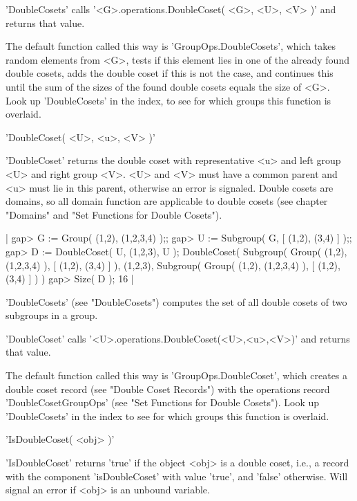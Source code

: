 'DoubleCosets' calls   '<G>.operations.DoubleCoset( <G>, <U>,  <V> )' and
returns that value.

The default  function called this  way is  'GroupOps.DoubleCosets', which
takes random elements from <G>, tests if this element lies  in one of the
already found double cosets, adds  the double  coset if this is  not  the
case, and continues this until the sum of the  sizes of  the found double
cosets equals the size of  <G>.  Look up 'DoubleCosets'  in the index, to
see for which groups this function is overlaid.

%

'DoubleCoset( <U>, <u>, <V> )'

'DoubleCoset'  returns the double coset with  representative <u> and left
group <U> and right group <V>.  <U> and <V> must have a common parent and
<u> must lie  in this parent,  otherwise  an error  is signaled.   Double
cosets are domains,  so all  domain function  are  applicable  to  double
cosets (see chapter "Domains" and "Set Functions for Double Cosets").

|    gap> G := Group( (1,2), (1,2,3,4) );;
    gap> U := Subgroup( G, [ (1,2), (3,4) ] );;
    gap> D := DoubleCoset( U, (1,2,3), U );
    DoubleCoset( Subgroup( Group( (1,2), (1,2,3,4) ), [ (1,2), (3,4) ] ),
    (1,2,3), Subgroup( Group( (1,2), (1,2,3,4) ), [ (1,2), (3,4) ] ) )
    gap> Size( D );
    16 |

'DoubleCosets' (see "DoubleCosets") computes the set of all double cosets
of two subgroups in a group.

'DoubleCoset' calls '<U>.operations.DoubleCoset(<U>,<u>,<V>)' and returns
that value.

The  default function called  this way  is 'GroupOps.DoubleCoset',  which
creates  a double  coset  record (see  "Double  Coset  Records") with the
operations record 'DoubleCosetGroupOps' (see  "Set  Functions  for Double
Cosets").  Look up  'DoubleCosets' in  the index to see  for which groups
this function is overlaid.

%

'IsDoubleCoset( <obj> )'

'IsDoubleCoset' returns 'true'  if the object <obj>   is a double  coset,
i.e., a record with the component  'isDoubleCoset' with value 'true', and
'false' otherwise.  Will signal an error if <obj> is an unbound variable.

